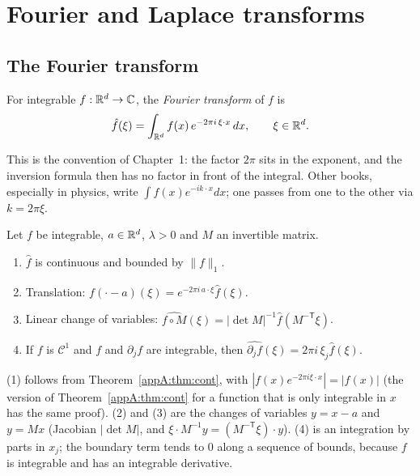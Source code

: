 \section{Fourier and Laplace transforms}\label{appA:sec:fourier}

\subsection{The Fourier transform}

\begin{definition}
For integrable $f:\mathbb{R}^d\to\mathbb{C}$, the \emph{Fourier transform} of $f$ is
\[\hat f(\xi)=\int_{\mathbb{R}^d}f(x)\,e^{-2\pi i\,\xi\cdot x}\,dx,\qquad\xi\in\mathbb{R}^d .\]
\end{definition}
This is the convention of Chapter~1: the factor $2\pi$ sits in the exponent, and the inversion formula then has no
factor in front of the integral. Other books, especially in physics, write $\int f(x)e^{-ik\cdot x}dx$; one passes
from one to the other via $k=2\pi\xi$.

\begin{proposition}\label{appA:prop:fourierprop}
Let $f$ be integrable, $a\in\mathbb{R}^d$, $\lambda>0$ and $M$ an invertible matrix.
\begin{enumerate}
\item $\hat f$ is continuous and bounded by $\|f\|_1$.
\item Translation: $\widehat{f(\cdot-a)}(\xi)=e^{-2\pi i\,a\cdot\xi}\hat f(\xi)$.
\item Linear change of variables: $\widehat{f\circ M}(\xi)=|\det M|^{-1}\hat f(M^{-\mathsf T}\xi)$.
\item If $f$ is $\mathcal C^1$ and $f$ and $\partial_jf$ are integrable, then $\widehat{\partial_jf}(\xi)=2\pi
i\,\xi_j\hat f(\xi)$.
\end{enumerate}
\end{proposition}

\begin{humanproof}
(1) follows from Theorem~\ref{appA:thm:cont}, with $|f(x)e^{-2\pi i\xi\cdot x}|=|f(x)|$ (the version of Theorem~\ref{appA:thm:cont} for a function that is only integrable in $x$ has the same proof). (2) and (3) are the changes
of variables $y=x-a$ and $y=Mx$ (Jacobian $|\det M|$, and $\xi\cdot M^{-1}y=(M^{-\mathsf T}\xi)\cdot y$). (4) is an
integration by parts in $x_j$; the boundary term tends to $0$ along a sequence of bounds, because $f$ is integrable
and has an integrable derivative.
\end{humanproof}

